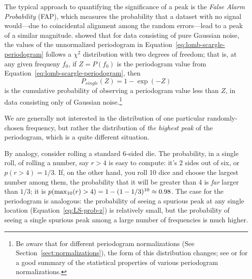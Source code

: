 \documentclass[preprint]{aastex}
\newcommand{\Eq}[1]{Equation~\ref{eq:#1}}
\newcommand{\eq}[1]{\Eq{#1}}
\newcommand{\eqlabel}[1]{\label{eq:#1}}
\newcommand{\Sect}[1]{Section~\ref{sect:#1}}
\newcommand{\sect}[1]{\Sect{#1}}
\begin{document}
The typical approach to quantifying the significance of a peak is the {\it
False Alarm Probability} (FAP), which measures the probability that a dataset
with no signal would---due to coincidental alignment among the random
errors---lead to a peak of a similar magnitude.
\citet{Scargle82} showed that for data consisting of pure Gaussian noise,
the values of the unnormalized
periodogram in \eq{lomb-scargle-periodogram} follows a $\chi^2$ distribution
with two degrees of freedom; that is, at any given frequeny $f_0$,
if $Z = P(f_0)$ is the periodogram value from \eq{lomb-scargle-periodogram},
then
\begin{equation}
  P_{single}(Z) = 1 - \exp(-Z)
  \eqlabel{LS-prob-z}
\end{equation}
is the cumulative probability of observing a periodogram value less than $Z$,
in data consisting only of Gaussian noise.\footnote{
  Be aware that for different periodogram normalizations
  (See \sect{normalizations}), the form of this distribution changes;
  see \citet{Cumming99} or
  \citet{Baluev2008} for a good summary of the statistical properties of
  various periodogram normalizations.
}


We are generally not interested in the distribution of one particular
randomly-chosen frequency,
but rather the distribution of {\it the highest peak} of the
periodogram, which is a quite different situation.

By analogy, consider rolling a standard 6-sided die.
The probability, in a single roll, of rolling a number, say $r > 4$ is easy
to compute: it's 2 sides out of six, or $p(r>4) = 1/3$.
If, on the other hand, you roll 10 dice and choose the largest number among
them, the probability that it will be greater than 4 is {\it far} larger
than $1/3$; it is $p({\rm max}_{10}(r) > 4) = 1 - (1 - 1/3)^{10} \approx 0.98$.
The case for the periodogram is analogous: the probability of seeing a
spurious peak at any single location (\eq{LS-prob-z}) is relatively small,
but the probability of seeing a single spurious peak among a large number
of frequencies is much higher.
\end{document}
